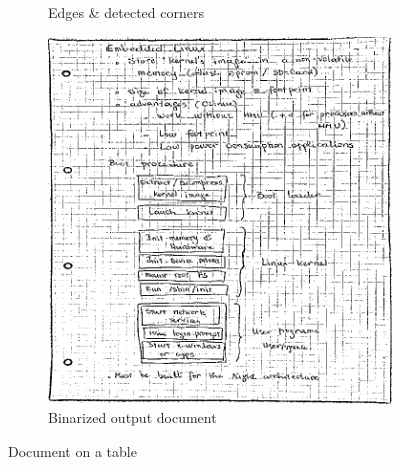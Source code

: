 \documentclass{scrartcl}
\begin{document}
\begin{figure}[!htbp]
\begin{subfigure}[b]{0.3\textwidth}
      \caption{Edges \& detected corners}
    \end{subfigure}
    \vfill
    \begin{subfigure}[b]{0.3\textwidth}
      \centering
      \includegraphics[width=\textwidth]{pictures/results/reference1/document.png}
      \caption{Binarized output document}
    \end{subfigure}

    \caption{Document on a table}
    \label{figure:doc-on-table}
  \end{figure}
\end{document}
